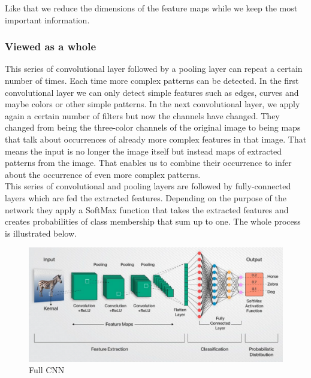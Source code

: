 \documentclass[a4paper,12pt]{report}
\begin{document}
	Like that we reduce the dimensions of the feature maps while we keep the most important information.
	
	\subsubsection{Viewed as a whole}
	
	This series of convolutional layer followed by a pooling layer can repeat a certain number of times. Each time more complex patterns can be detected. In the first convolutional layer we can only detect simple features such as edges, curves and maybe colors or other simple patterns. In the next convolutional layer, we apply again a certain number of filters but now the channels have changed. They changed from being the three-color channels of the original image to being maps that talk about occurrences of already more complex features in that image. That means the input is no longer the image itself but instead maps of extracted patterns from the image. That enables us to combine their occurrence to infer about the occurrence of even more complex patterns. \\
	This series of convolutional and pooling layers are followed by fully-connected layers which are fed the extracted features. Depending on the purpose of the network they apply a SoftMax function that takes the extracted features and creates probabilities of class membership that sum up to one. The whole process is illustrated below.
	
\begin{figure}[htbp]
  \centering
  \includegraphics[width=\textwidth]{images/full_CNN.png}
  \caption{Full CNN}
  \label{fig:fullwidth}
\end{figure}
	
\end{document}
